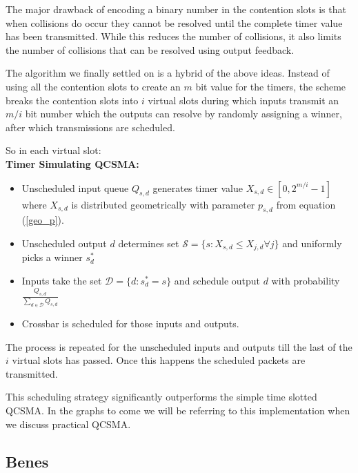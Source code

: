 \documentclass{IEEEtran}%
\begin{document}
	The major drawback of encoding a binary number in the contention slots is that when collisions do occur they cannot be resolved until the complete timer value has been transmitted.  While this reduces the number of collisions, it also limits the number of collisions that can be resolved using output feedback.
	
	The algorithm we finally settled on is a hybrid of the above ideas.  Instead of using all the contention slots to create an $m$ bit value for the timers, the scheme breaks the contention slots into $i$ virtual slots during which inputs transmit an $m/i$ bit number which the outputs can resolve by randomly assigning a winner, after which transmissions are scheduled.
	
	So in each virtual slot:\\
	 
{\bf Timer Simulating QCSMA:}
\begin{itemize}
\item Unscheduled input queue $Q_{s,d}$ generates timer value $X_{s,d}\in[0, 2^{m/i}-1]$ where  $X_{s,d}$ is distributed geometrically with parameter $p_{s,d}$ from equation (\ref{geo_p}).
\item Unscheduled output $d$ determines set $\mathcal{S}=\{s:X_{s,d}\leq{X_{j,d}}\forall j\}$ and uniformly picks a winner $s_d^*$
\item Inputs take the set $\mathcal{D}=\{d:s_d^*=s\}$ and schedule output $d$ with probability $\frac{Q_{s,d}}{\sum_{d\in \mathcal{D}}Q_{s,d}}$
\item Crossbar is scheduled for those inputs and outputs.\\
\end{itemize}

The process is repeated for the unscheduled inputs and outputs till the last of the $i$ virtual slots has passed.  Once this happens the scheduled packets are transmitted.  

This scheduling strategy significantly outperforms the simple time slotted QCSMA.  In the graphs to come we will be referring to this implementation when we discuss practical QCSMA.

\subsection{Benes}

\end{document}
